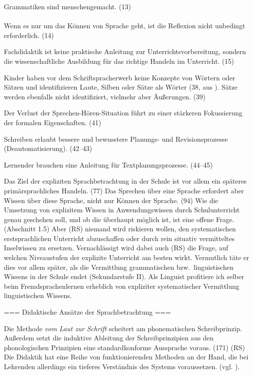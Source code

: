 Grammatiken sind menschengemacht. (13)



\paragraph{\citet{Bredel2013}}

Wenn es nur um das Können von Sprache geht, ist die Reflexion nicht unbedingt erforderlich. (14)

Fachdidaktik ist keine praktische Anleitung zur Unterrichtsvorbereitung, sondern die wissenschaftliche Ausbildung für das richtige Handeln im Unterricht. (15)


Kinder haben vor dem Schriftspracherwerb keine Konzepte von Wörtern oder Sätzen und identifizieren Laute, Silben oder Sätze als Wörter (38, aus \citealt{SteinigHuneke2002}).
Sätze werden ebenfalls nicht identifiziert, vielmehr aber Äußerungen. (39)


Der Verlust der Sprechen-Hören-Situation führt zu einer stärkeren Fokussierung der formalen Eigenschaften. (41)

Schreiben erlaubt bessere und bewusstere Planungs- und Revisionsprozesse (Deautomatisierung). (42--43)

Lernender brauchen eine Anleitung für Textplanungsprozesse. (44--45)


Das Ziel der expliziten Sprachbetrachtung in der Schule ist vor allem ein späteres primärsprachliches Handeln. (77)
Das Sprechen über eine Sprache erfordert aber Wissen über diese Sprache, nicht nur Können der Sprache. (94)
Wie die Umsetzung von explizitem Wissen in Anwendungswissen durch Schulunterricht genau geschehen soll, und ob die überhaupt möglich ist, ist eine offene Frage. (Abschnitt 1.5) Aber (RS) niemand wird riskieren wollen, den systematischen erstsprachlichen Unterricht abzuschaffen oder durch rein situativ vermitteltes Inselwissen zu ersetzen. Vernachlässigt wird dabei auch (RS) die Frage, auf welchen Niveaustufen der explizite Unterricht am besten wirkt. Vermutlich täte er dies vor allem später, als die Vermittlung grammatischen bzw.\ linguistischen Wissens in der Schule endet (Sekundarstufe II). Als Linguist profitiere ich selber \zB beim Fremdsprachenlernen erheblich von expliziter systematischer Vermittlung linguistischen Wissens.

=== Didaktische Ansätze der Sprachbetrachtung ===

Die Methode \textit{vom Laut zur Schrift} scheitert am phonematischen Schreibprinzip.
Außerdem setzt die induktive Ableitung der Schreibprinzipien aus den phonologischen Prinzipien eine standardkonforme Aussprache voraus. (171)
(RS) Die Didaktik hat eine Reihe von funktionierenden Methoden an der Hand, die bei Lehrenden allerdings ein tieferes Verständnis des Systems voraussetzen. (vgl. \citealt[Abschnit~2.1]{Bredel2013}).

